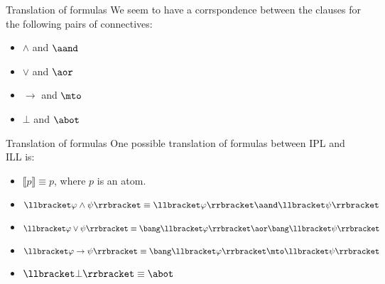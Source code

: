 \documentclass{beamer}
\begin{document}
\begin{frame}{Translation of formulas}
	We seem to have a corrspondence between the clauses for the following pairs of connectives:
	\begin{center}
		\begin{itemize}
			\item $\land$ and $\aand$
			\item $\lor$ and $\aor$
			\item $\to$ and $\mto$
			\item $\bot$ and $\abot$
		\end{itemize}
	\end{center}
\end{frame}
\begin{frame}{Translation of formulas}
	One possible translation of formulas between IPL and ILL is:
	\begin{center}
	\begin{itemize}
        \item $\llbracket p\rrbracket \equiv p$, where $p$ is an atom.
        \item $\llbracket\varphi\land\psi\rrbracket \equiv \llbracket \varphi \rrbracket \aand \llbracket \psi \rrbracket$ 
        \item $\llbracket\varphi \lor\psi\rrbracket \equiv \bang\llbracket \varphi \rrbracket \aor \bang\llbracket \psi \rrbracket$ 
        \item $\llbracket\varphi \to \psi\rrbracket \equiv \bang\llbracket \varphi \rrbracket \mto \llbracket \psi \rrbracket$
        \item $\llbracket\bot\rrbracket \equiv \abot$
	\end{itemize}
	\end{center}
\end{frame}
\end{document}
